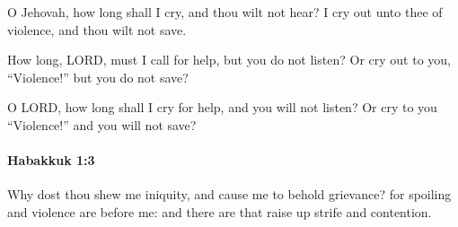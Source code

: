 			\begin{versebox}
					\item[BHS] 
					\item[LXX] 
					\item[ASV] O Jehovah, how long shall I cry, and thou wilt not hear? I cry out unto thee of violence, and thou wilt not save.
					\item[NIV] How long, LORD, must I call for help, but you do not listen? Or cry out to you, “Violence!” but you do not save?
					\item[NRSV] O LORD, how long shall I cry for help, and you will not listen? Or cry to you “Violence!” and you will not save?
			\end{versebox}

		\paragraph{Habakkuk 1:3} %
			\label{HABAKKUK-1-3}

			Why dost thou shew me iniquity, and cause me to behold grievance? for spoiling and violence are before me: and there are that raise up strife and contention.

